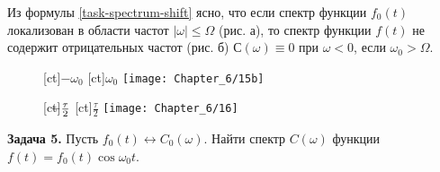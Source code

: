 Из формулы \eqref{task-spectrum-shift} ясно, что если спектр функции $f_0(t)$ локализован в области частот $|\omega|\le\Omega$ (рис. а),
то спектр функции $f(t)$ не содержит отрицательных частот (рис. б) $С(\omega)\equiv 0$ при $\omega<0$, если
$\omega_0>\Omega$.




%

\begin{figure}[h!]
	[ct]{$-\omega_0$}
	[ct]{$\omega_0$}
	\texttt{[image: Chapter\_6/15b]}
	\caption{}
\end{figure}
\begin{figure}[h!]
	[ct]{$\llap{$-$}\frac{\tau}{2}$}
	[ct]{$\frac{\tau}{2}$}
	\texttt{[image: Chapter\_6/16]}
	\caption{}
\end{figure}

\textbf{Задача 5.} Пусть $f_0(t)\leftrightarrow C_0(\omega)$. Найти спектр $C(\omega)$ функции $f(t)=f_0(t)\cos\omega_0t$.


